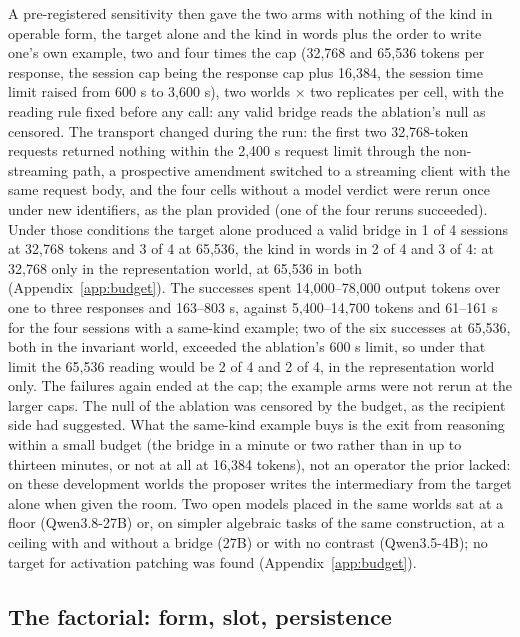 \documentclass[11pt]{article}
\begin{document}
A pre-registered sensitivity then gave the two arms with nothing of the
kind in operable form, the target alone and the kind in words plus the
order to write one's own example, two and four times the cap (32{,}768
and 65{,}536 tokens per response, the session cap being the response cap
plus 16{,}384, the session time limit raised from 600 s to 3{,}600 s), two
worlds $\times$ two replicates per cell, with the reading rule fixed before
any call: any valid bridge reads the ablation's null as censored. The
transport changed during the run: the first two 32{,}768-token requests
returned nothing within the 2{,}400 s request limit through the
non-streaming path, a prospective amendment switched to a streaming client
with the same request body, and the four cells without a model verdict
were rerun once under new identifiers, as the plan provided (one of the
four reruns succeeded). Under those conditions the target alone produced a
valid bridge in 1 of 4 sessions at 32{,}768 tokens and 3 of 4 at 65{,}536,
the kind in words in 2 of 4 and 3 of 4: at 32{,}768 only in the
representation world, at 65{,}536 in both (Appendix~\ref{app:budget}). The
successes spent 14{,}000--78{,}000 output tokens over one to three responses
and 163--803 s, against 5{,}400--14{,}700 tokens and 61--161 s for the four
sessions with a same-kind example; two of the six successes at 65{,}536,
both in the invariant world, exceeded the ablation's 600 s limit, so under
that limit the 65{,}536 reading would be 2 of 4 and 2 of 4, in the
representation world only. The failures again ended at the cap; the
example arms were not rerun at the larger caps. The null of the ablation
was censored by the budget, as the recipient side had suggested. What the
same-kind example buys is the exit from reasoning within a small budget
(the bridge in a minute or two rather than in up to thirteen minutes,
or not at all at 16{,}384 tokens), not an operator the prior lacked: on
these development worlds the proposer writes the intermediary from the
target alone when given the room. Two open models placed in the same
worlds sat at a floor (Qwen3.8-27B) or, on simpler algebraic tasks of the
same construction, at a ceiling with and without a bridge (27B) or with no
contrast (Qwen3.5-4B); no target for activation patching was found
(Appendix~\ref{app:budget}).

\subsection{The factorial: form, slot, persistence}
\label{sec:factorial}
\end{document}
